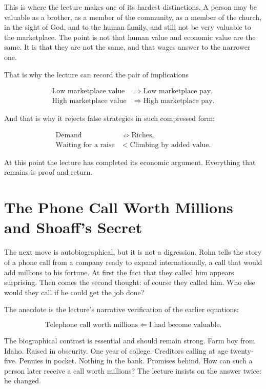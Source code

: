 This is where the lecture makes one of its hardest distinctions. A person may be valuable as a brother, as a member of the community, as a member of the church, in the sight of God, and to the human family, and still not be very valuable to the marketplace. The point is not that human value and economic value are the same. It is that they are not the same, and that wages answer to the narrower one.

That is why the lecture can record the pair of implications

\begin{align}
\text{Low marketplace value} &\Longrightarrow \text{Low marketplace pay},\\
\text{High marketplace value} &\Longrightarrow \text{High marketplace pay}.
\end{align}

And that is why it rejects false strategies in such compressed form:

\begin{align}
\text{Demand} &\not\Longrightarrow \text{Riches},\\
\text{Waiting for a raise} &< \text{Climbing by added value}.
\end{align}

At this point the lecture has completed its economic argument. Everything that remains is proof and return.

\section{The Phone Call Worth Millions and Shoaff's Secret}

The next move is autobiographical, but it is not a digression. Rohn tells the story of a phone call from a company ready to expand internationally, a call that would add millions to his fortune. At first the fact that they called him appears surprising. Then comes the second thought: of course they called him. Who else would they call if he could get the job done?

The anecdote is the lecture's narrative verification of the earlier equations:

\begin{equation}
\text{Telephone call worth millions} \Longleftarrow \text{I had become valuable}.
\end{equation}

The biographical contrast is essential and should remain strong. Farm boy from Idaho. Raised in obscurity. One year of college. Creditors calling at age twenty-five. Pennies in pocket. Nothing in the bank. Promises behind. How can such a person later receive a call worth millions? The lecture insists on the answer twice: he changed.

